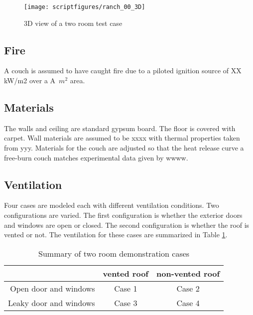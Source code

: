 \documentclass[11pt]{book}
\begin{document}
\begin{figure}[\figoptions]
\begin{center}
\texttt{[image: scriptfigures/ranch\_00\_3D]}\\
\end{center}
\caption {3D view of a two room test case}
\label{fig2roomplan}%
\end{figure}

\subsection{Fire}
A couch is assumed to have caught fire due to a piloted ignition source of XX kW/m2 over
a A~$m^2$ area.


\subsection{Materials}
The walls and ceiling are standard gypsum board.  The floor is
covered with carpet.  Wall materials are assumed to be xxxx with thermal properties taken from yyy.  Materials for the couch
are adjusted so that the heat release curve a free-burn couch matches experimental data given by wwww.

\subsection{Ventilation}
Four cases are modeled each with different ventilation conditions.  Two configurations are varied.  The first configuration is whether the exterior doors and windows are open or closed.  The second configuration is whether the roof is vented or not.  The ventilation for these cases are summarized in Table \ref{tab:demoranch}.

\begin{table}[ht]
\caption{Summary of two room demonstration cases}
\vspace{0.1in}
\label{tab:demoranch}
\begin{center}
\begin{tabular}{|r||c|c|}
  \hline
   & vented roof & non-vented roof \\ \hline
  Open door and windows & Case 1 & Case 2 \\
  Leaky door and windows & Case 3 & Case 4 \\
  \hline
  \end{tabular}
\end{center}
\end{table}
\end{document}
